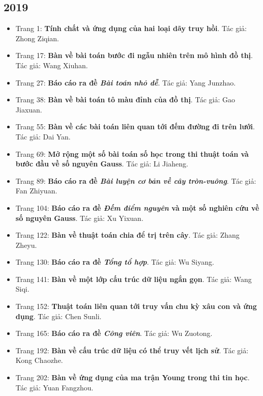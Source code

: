 \documentclass[11pt]{article}
\begin{document}
\subsection{2019}
\begin{itemize}[leftmargin=2em]
  \item Trang 1: \textbf{Tính chất và ứng dụng của hai loại dãy truy hồi}. Tác giả: Zhong Ziqian.
  \item Trang 17: \textbf{Bàn về bài toán bước đi ngẫu nhiên trên mô hình đồ thị}. Tác giả: Wang Xiuhan.
  \item Trang 27: \textbf{Báo cáo ra đề \emph{Bài toán nhỏ dễ}}. Tác giả: Yang Junzhao.
  \item Trang 38: \textbf{Bàn về bài toán tô màu đỉnh của đồ thị}. Tác giả: Gao Jiaxuan.
  \item Trang 55: \textbf{Bàn về các bài toán liên quan tới đếm đường đi trên lưới}. Tác giả: Dai Yan.
  \item Trang 69: \textbf{Mở rộng một số bài toán số học trong thi thuật toán và bước đầu về số nguyên Gauss}. Tác giả: Li Jiaheng.
  \item Trang 89: \textbf{Báo cáo ra đề \emph{Bài luyện cơ bản về cây tròn-vuông}}. Tác giả: Fan Zhiyuan.
  \item Trang 104: \textbf{Báo cáo ra đề \emph{Đếm điểm nguyên} và một số nghiên cứu về số nguyên Gauss}. Tác giả: Xu Yixuan.
  \item Trang 122: \textbf{Bàn về thuật toán chia để trị trên cây}. Tác giả: Zhang Zheyu.
  \item Trang 130: \textbf{Báo cáo ra đề \emph{Tổng tổ hợp}}. Tác giả: Wu Siyang.
  \item Trang 141: \textbf{Bàn về một lớp cấu trúc dữ liệu ngắn gọn}. Tác giả: Wang Siqi.
  \item Trang 152: \textbf{Thuật toán liên quan tới truy vấn chu kỳ xâu con và ứng dụng}. Tác giả: Chen Sunli.
  \item Trang 165: \textbf{Báo cáo ra đề \emph{Công viên}}. Tác giả: Wu Zuotong.
  \item Trang 192: \textbf{Bàn về cấu trúc dữ liệu có thể truy vết lịch sử}. Tác giả: Kong Chaozhe.
  \item Trang 202: \textbf{Bàn về ứng dụng của ma trận Young trong thi tin học}. Tác giả: Yuan Fangzhou.
\end{itemize}
\end{document}
